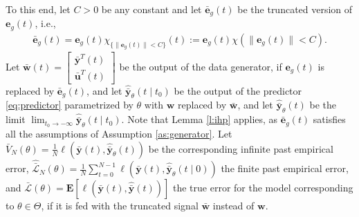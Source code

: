 \documentclass{article}
\def\rvu{{\mathbf{i}}}
\def\rvu{{\mathbf{u}}}
\def\rvw{{\mathbf{w}}}
\def\rvy{{\mathbf{y}}}
\newcommand{\e}{\mathbf{e}}
\newcommand{\bE}{\mathbf{E}}
\begin{document}
To this end, let 
$C > 0$ be any constant and let 
$\bar{\e}_g(t)$ be the truncated version of $\e_g(t)$, i.e., 
\begin{align}\label{e-}
\bar{\e}_g(t)=\e_g(t) \chi_{\{\|\e_g(t)\| < C\}}(t)
:=\e_g(t) \chi(\|\e_g(t)\| < C). 
\end{align}
Let $\bar{\rvw}(t)=\begin{bmatrix} \bar{\rvy}^T(t) \\ \bar{\rvu}^T(t) \end{bmatrix}$ be the output of the data generator, if $\e_g(t)$ is replaced by $\bar{\e}_g(t)$, and let 
$\hat{\bar{\rvy}}_{\theta}(t \mid t_0)$ be the output of    the predictor 
\eqref{eq:predictor}
parametrized by $\theta$
with $\rvw$ replaced by $\bar{\rvw}$, and let 
$\hat{\bar{\rvy}}_{\theta}(t)$ 
be the limit 
$\lim_{t_0 \rightarrow -\infty} \hat{\bar{\rvy}}_{\theta}(t \mid t_0)$.
Note that Lemma \ref{l:ihp} applies, as $\bar{\e}_g(t)$ satisfies all the assumptions of
Assumption \ref{as:generator}.
Let $\bar{V}_N(\theta)=\frac{1}{N} \ell(\bar{\rvy}(t),\hat{\bar{\rvy}}_{\theta}(t))$ be the corresponding infinite past empirical error, 
$\hat{\bar{\mathcal{L}}}_N(\theta)=\frac{1}{N}\sum_{t=0}^{N-1} \ell(\bar{\rvy}(t),\hat{\bar{\rvy}}_{\theta}(t \mid 0))$
the finite past empirical error, and 
$\bar{\mathcal{L}}(\theta)=\bE[\ell(\bar{\rvy}(t),\hat{\bar{\rvy}}(t))]$ the true error for the model corresponding to $\theta \in \Theta$, if it is fed with the truncated signal $\bar{\rvw}$
instead of $\rvw$. 
\end{document}
